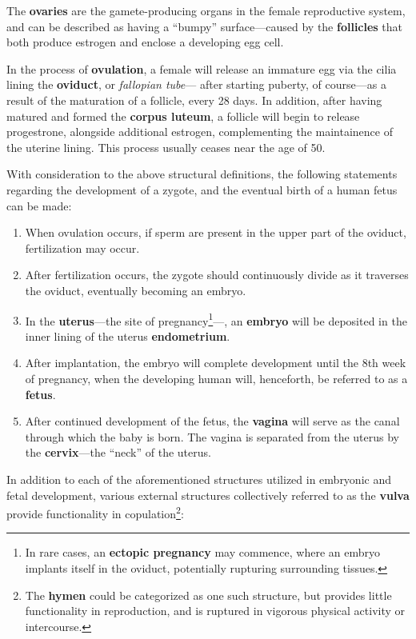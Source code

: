 \documentclass{article}
\begin{document}
The \textbf{ovaries} are the gamete-producing organs in the female reproductive
system, and can be described as having a ``bumpy'' surface---caused by the
\textbf{follicles} that both produce estrogen and enclose a developing egg cell.

In the process of \textbf{ovulation}, a female will release an immature egg via the
cilia lining the \textbf{oviduct}, or \emph{fallopian tube}---
after starting puberty, of course---as a result of the maturation of a follicle,
every 28 days. In addition, after having matured and formed the \textbf{corpus luteum},
a follicle will begin to release progestrone, alongside additional estrogen, complementing
the maintainence of the uterine lining. This process usually ceases near the age of 50.

With consideration to the above structural definitions, the following statements
regarding the development of a zygote, and the eventual birth of a human fetus
can be made:

\begin{enumerate}
	\item When ovulation occurs, if sperm are present in the upper part of the oviduct,
		fertilization may occur.
	\item After fertilization occurs, the zygote should continuously divide as it traverses
		the oviduct, eventually becoming an embryo.
	\item In the \textbf{uterus}---the site of
		pregnancy\footnote{In rare cases, an \textbf{ectopic pregnancy} may
		commence, where an embryo implants itself in the oviduct, potentially
		rupturing surrounding tissues.}---, an \textbf{embryo} will be
		deposited in the inner lining of the uterus \textbf{endometrium}.
	\item After implantation, the embryo will complete development until the 8th week of
		pregnancy, when the developing human will, henceforth, be referred to as a
		\textbf{fetus}.
	\item After continued development of the fetus, the \textbf{vagina} will serve as the
		canal through which the baby is born. The vagina is separated from the uterus by
		the \textbf{cervix}---the ``neck'' of the uterus.
\end{enumerate}

In addition to each of the aforementioned structures utilized in embryonic and
fetal development, various external structures collectively referred to as the
\textbf{vulva} provide functionality in
copulation\footnote{The \textbf{hymen} could be categorized as one such structure,
but provides little functionality in reproduction, and is ruptured in vigorous
physical activity or intercourse.}:
\end{document}
